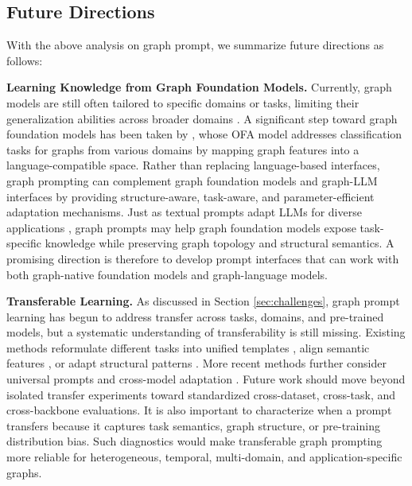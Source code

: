 \subsection{Future Directions}
With the above analysis on graph prompt, we summarize future directions as follows:

\textbf{Learning Knowledge from Graph Foundation Models.} Currently, graph models are still often tailored to specific domains or tasks, limiting their generalization abilities across broader domains \cite{liu2023graph, zhu2023graphcontrol}. A significant step toward graph foundation models has been taken by \citet{liu2023one}, whose OFA model addresses classification tasks for graphs from various domains by mapping graph features into a language-compatible space. Rather than replacing language-based interfaces, graph prompting can complement graph foundation models and graph-LLM interfaces by providing structure-aware, task-aware, and parameter-efficient adaptation mechanisms. Just as textual prompts adapt LLMs for diverse applications \cite{robinson2023leveraging, wang2023knowledge, brown2020language}, graph prompts may help graph foundation models expose task-specific knowledge while preserving graph topology and structural semantics. A promising direction is therefore to develop prompt interfaces that can work with both graph-native foundation models and graph-language models.


\textbf{Transferable Learning.} As discussed in Section \ref{sec:challenges}, graph prompt learning has begun to address transfer across tasks, domains, and pre-trained models, but a systematic understanding of transferability is still missing. Existing methods reformulate different tasks into unified templates \cite{sun2023all, huang2023prodigy}, align semantic features \cite{zhu2023graphcontrol}, or adapt structural patterns \cite{zhao2023graphglow}. More recent methods further consider universal prompts and cross-model adaptation \cite{huang2025oneprompt, he2026gp2f}. Future work should move beyond isolated transfer experiments toward standardized cross-dataset, cross-task, and cross-backbone evaluations. It is also important to characterize when a prompt transfers because it captures task semantics, graph structure, or pre-training distribution bias. Such diagnostics would make transferable graph prompting more reliable for heterogeneous, temporal, multi-domain, and application-specific graphs.




